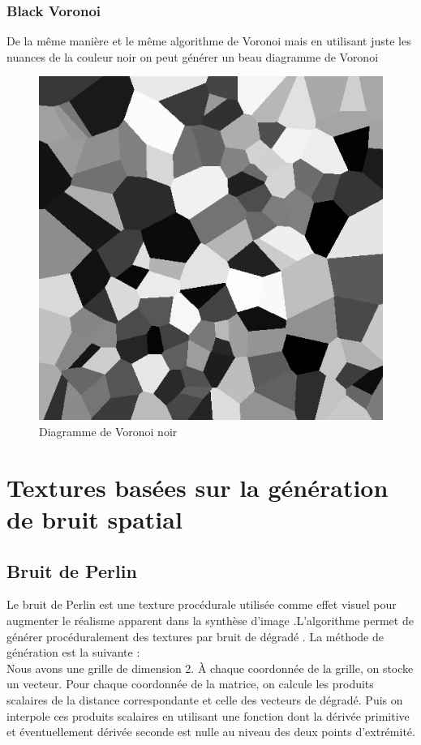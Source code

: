 \documentclass[a4paper,10pt]{article}
\begin{document}
\subsubsection{Black Voronoi}
De la même manière et le même algorithme de Voronoi mais en utilisant juste les nuances de la couleur noir on peut générer un beau diagramme de Voronoi  
\begin{figure}[h]
    \centering
    \includegraphics[scale=0.4]{vosBlack.png}
    \caption{Diagramme de Voronoi noir}
\end{figure}


\section{Textures basées sur la génération de bruit spatial}
\subsection{ Bruit de Perlin}
Le bruit de Perlin est une texture procédurale utilisée comme effet visuel pour augmenter le réalisme apparent dans la synthèse d'image .L'algorithme permet de générer procéduralement des textures par bruit de dégradé .
La méthode de génération est la suivante :\\
Nous avons une grille de dimension 2. À chaque coordonnée de la grille, on stocke un vecteur. Pour chaque coordonnée de la matrice, on calcule les produits scalaires de la distance correspondante et celle des vecteurs de dégradé. Puis on interpole ces produits scalaires en utilisant une fonction dont la dérivée primitive et éventuellement dérivée seconde est nulle au niveau des deux points d'extrémité.\\
\end{document}

